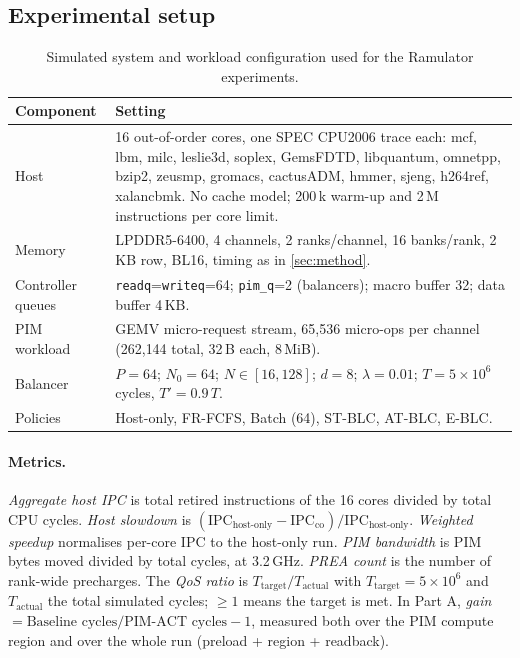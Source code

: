 \documentclass[conference]{IEEEtran}
\newcommand{\cmd}[1]{\texttt{\footnotesize #1}}
\newcommand{\stblc}{ST-BLC}
\newcommand{\atblc}{AT-BLC}
\newcommand{\eblc}{E-BLC}
\begin{document}
\subsection{Experimental setup}
\begin{table}[!t]
\centering
\caption{Simulated system and workload configuration used for the Ramulator experiments.}\label{tab:config}
\footnotesize
\begin{tabular}{@{}p{3.2cm}p{13.8cm}@{}}
\toprule
\textbf{Component} & \textbf{Setting}\\
\midrule
Host & 16 out-of-order cores, one SPEC CPU2006 trace each: mcf, lbm, milc, leslie3d, soplex, GemsFDTD, libquantum, omnetpp, bzip2, zeusmp, gromacs, cactusADM, hmmer, sjeng, h264ref, xalancbmk. No cache model; 200\,k warm-up and 2\,M instructions per core limit.\\
Memory & LPDDR5-6400, 4 channels, 2 ranks/channel, 16 banks/rank, 2\,KB row, BL16, timing as in \cref{sec:method}.\\
Controller queues & \cmd{readq}=\cmd{writeq}=64; \cmd{pim\_q}=2 (balancers); macro buffer 32; data buffer 4\,KB.\\
PIM workload & GEMV micro-request stream, 65{,}536 micro-ops per channel (262{,}144 total, 32\,B each, 8\,MiB).\\
Balancer & $P=64$; $N_0=64$; $N\in[16,128]$; $d=8$; $\lambda=0.01$; $T=5\times10^{6}$ cycles, $T'=0.9\,T$.\\
Policies & Host-only, FR-FCFS, Batch (64), \stblc, \atblc, \eblc.\\
\bottomrule
\end{tabular}
\end{table}

\paragraph{Metrics.} \emph{Aggregate host IPC} is total retired instructions of the 16 cores divided by total CPU cycles. \emph{Host slowdown} is $(\mathrm{IPC}_{\mathrm{host\text{-}only}}-\mathrm{IPC}_{\mathrm{co}})/\mathrm{IPC}_{\mathrm{host\text{-}only}}$. \emph{Weighted speedup} normalises per-core IPC to the host-only run. \emph{PIM bandwidth} is PIM bytes moved divided by total cycles, at 3.2\,GHz. \emph{PREA count} is the number of rank-wide precharges. The \emph{QoS ratio} is $T_{\mathrm{target}}/T_{\mathrm{actual}}$ with $T_{\mathrm{target}}=5\times10^6$ and $T_{\mathrm{actual}}$ the total simulated cycles; $\ge 1$ means the target is met. In Part A, \emph{gain} $=\text{Baseline cycles}/\text{PIM-ACT cycles}-1$, measured both over the PIM compute region and over the whole run (preload + region + readback).
\end{document}
